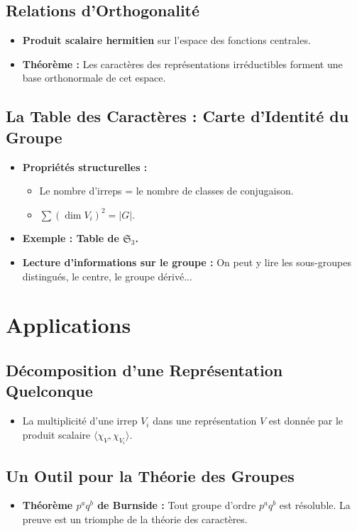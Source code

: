\documentclass[12pt, a4paper, parskip=full]{report}
\theoremstyle{agregstyle}
\begin{document}
\subsection{Relations d'Orthogonalité}
\begin{itemize}
    \item \textbf{Produit scalaire hermitien} sur l'espace des fonctions centrales.
    \item \textbf{Théorème :} Les caractères des représentations irréductibles forment une base orthonormale de cet espace.
\end{itemize}
\subsection{La Table des Caractères : Carte d'Identité du Groupe}
\begin{itemize}
    \item \textbf{Propriétés structurelles :}
        \begin{itemize}
            \item Le nombre d'irreps = le nombre de classes de conjugaison.
            \item $\sum (\dim V_i)^2 = |G|$.
        \end{itemize}
    \item \textbf{Exemple : Table de $\mathfrak{S}_3$.}
    \item \textbf{Lecture d'informations sur le groupe :} On peut y lire les sous-groupes distingués, le centre, le groupe dérivé...
\end{itemize}

\section{Applications}
\subsection{Décomposition d'une Représentation Quelconque}
\begin{itemize}
    \item La multiplicité d'une irrep $V_i$ dans une représentation $V$ est donnée par le produit scalaire $\langle \chi_V, \chi_{V_i} \rangle$.
\end{itemize}
\subsection{Un Outil pour la Théorie des Groupes}
\begin{itemize}
    \item \textbf{Théorème $p^a q^b$ de Burnside :} Tout groupe d'ordre $p^a q^b$ est résoluble. La preuve est un triomphe de la théorie des caractères.
\end{itemize}
\end{document}
